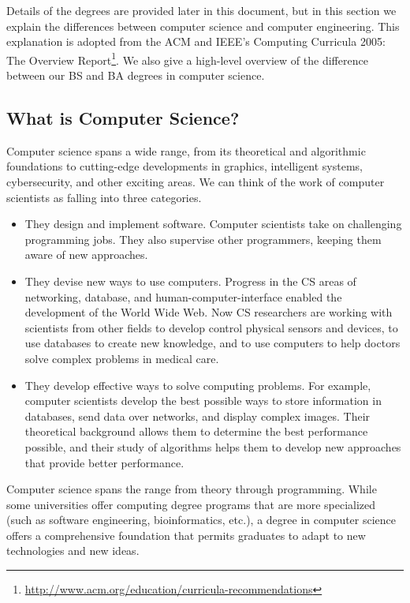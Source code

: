 \documentclass[10pt,letter]{book}
\newenvironment{itemlist}{
\begin{itemize}
\setlength{\itemsep}{0pt}
\setlength{\parskip}{0pt}}
{\end{itemize}}
\newcommand{\myurl}[1]{\footnote{\scriptsize\url{#1}}}
\begin{document}
Details of the degrees are provided later in this document, but in
this section we explain the differences between computer science and
computer engineering. This explanation is adopted from the ACM and
IEEE's Computing Curricula 2005: The Overview
Report\myurl{http://www.acm.org/education/curricula-recommendations}. We
also give a high-level overview of the difference between our BS and
BA degrees in computer science.

\subsection{What is Computer Science?}

Computer science spans a wide range, from its theoretical and
algorithmic foundations to cutting-edge developments in graphics,
intelligent systems, cybersecurity, and other exciting areas. We can
think of the work of computer scientists as falling into three
categories.

\begin{itemlist}
\item They design and implement software. Computer scientists take on
  challenging programming jobs. They also supervise other programmers,
  keeping them aware of new approaches.
\item They devise new ways to use computers. Progress in the CS areas
  of networking, database, and human-computer-interface enabled the
  development of the World Wide Web. Now CS researchers are working
  with scientists from other fields to develop control physical
  sensors and devices, to use databases to create new knowledge, and
  to use computers to help doctors solve complex problems in medical
  care.
\item They develop effective ways to solve computing problems. For
  example, computer scientists develop the best possible ways to store
  information in databases, send data over networks, and display
  complex images. Their theoretical background allows them to
  determine the best performance possible, and their study of
  algorithms helps them to develop new approaches that provide better
  performance.
\end{itemlist}

Computer science spans the range from theory through
programming. While some universities offer computing degree programs
that are more specialized (such as software engineering,
bioinformatics, etc.), a degree in computer science offers a
comprehensive foundation that permits graduates to adapt to new
technologies and new ideas.
\end{document}
